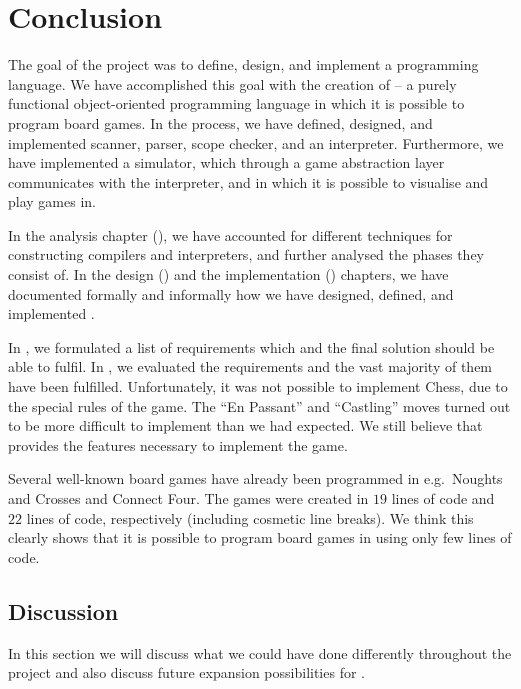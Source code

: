 \chapter{Conclusion}
\label{chap:conclusion}

The goal of the project was to define, design, and implement a programming
language.  We have accomplished this goal with the creation of \productname{} --
a purely functional object-oriented programming language in which it is possible to
program board games. In the process, we have defined, designed, and implemented
scanner, parser, scope checker, and an interpreter. Furthermore, we have
implemented a simulator, which through a game abstraction layer communicates with
the interpreter, and in which it is possible to visualise and play
\productname{} games in.

In the analysis chapter (), we have
accounted for different techniques for constructing compilers
and interpreters, and further analysed the phases they consist
of. In the design () and the implementation
() chapters, we have documented formally
and informally how we have designed, defined, and implemented
\productname{}.

In , we formulated a list of requirements
which \productname{} and the final solution should be able to fulfil. In
, we evaluated the requirements and
the vast majority of them have been fulfilled. Unfortunately, it was not
possible to implement Chess, due to the special rules of the game. The
``En Passant'' and ``Castling'' moves turned out to be more difficult
to implement than we had expected. We still believe that \productname{}
provides the features necessary to implement the game.

Several well-known board games have already been programmed in
\productname{} e.g.\ Noughts and Crosses and Connect Four. The games
were created in $19$ lines of code and $22$ lines of code, respectively
(including cosmetic line breaks). We think this clearly shows that it is
possible to program board games in \productname{} using only few lines
of code.

\section{Discussion}
\label{sec:discussion}

In this section we will discuss what we could have done differently throughout
the project and also discuss future expansion possibilities for \productname{}.

%







